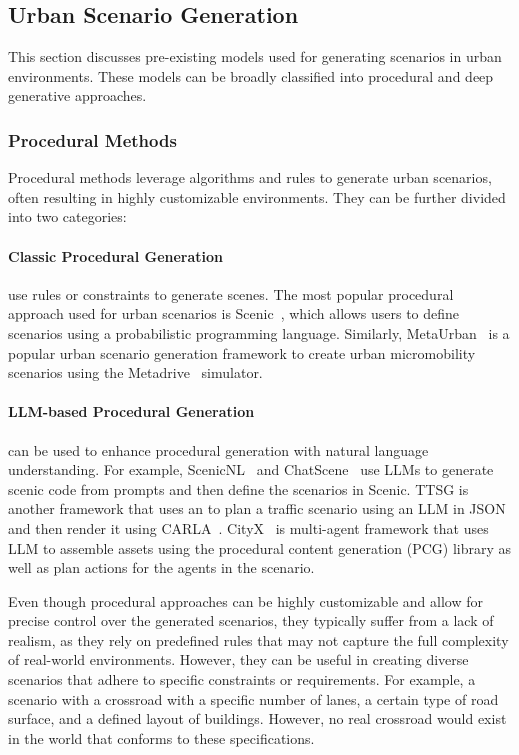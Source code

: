 \documentclass{article}
\begin{document}
\subsection{Urban Scenario Generation}

This section discusses pre-existing models used for generating scenarios in urban environments. These models can be broadly classified into procedural and deep generative approaches.

\subsubsection{Procedural Methods}

Procedural methods leverage algorithms and rules to generate urban scenarios, often resulting in highly customizable environments. They can be further divided into two categories:

\paragraph{Classic Procedural Generation} use rules or constraints to generate scenes. The most popular procedural approach used for urban scenarios is Scenic~\cite{fremont2019scenic}, which allows users to define scenarios using a probabilistic programming language. Similarly, MetaUrban~\cite{wu2024metaurban} is a popular urban scenario generation framework to create urban micromobility scenarios using the Metadrive~\cite{li2022metadrive} simulator.

\paragraph{LLM-based Procedural Generation} can be used to enhance procedural generation with natural language understanding. For example, ScenicNL~\cite{elmaaroufi2024scenicnl} and ChatScene~\cite{zhang2024chatscene} use LLMs to generate scenic code from prompts and then define the scenarios in Scenic. TTSG\cite{ruan2024traffic} is another framework that uses an to plan a traffic scenario using an LLM in JSON and then render it using CARLA~\cite{dosovitskiy2017carla}. CityX~\cite{zhang2024cityx} is multi-agent framework that uses LLM to assemble assets using the procedural content generation (PCG) library as well as plan actions for the agents in the scenario.

Even though procedural approaches can be highly customizable and allow for precise control over the generated scenarios, they typically suffer from a lack of realism, as they rely on predefined rules that may not capture the full complexity of real-world environments. However, they can be useful in creating diverse scenarios that adhere to specific constraints or requirements. For example, a scenario with a crossroad with a specific number of lanes, a certain type of road surface, and a defined layout of buildings. However, no real crossroad would exist in the world that conforms to these specifications.
\end{document}
